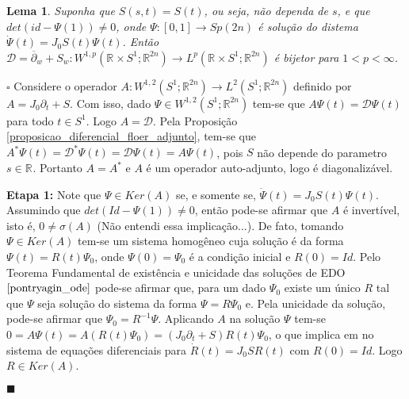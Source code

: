 \documentclass[12pt]{book}
\newtheorem{lema}[teorema]{Lema}
\newenvironment{prova}[1]{$\square$ #1}{\hfill$\blacksquare$}
\newcommand{\circulo}{S^{1}}
\newcommand{\diferencialfloerabrev}{\mathcal{D}}
\newcommand{\derivadaparcialabrev}[1]{\partial_{#1}}
\newcommand{\espacoLdois}[1]{L^{2}(#1)}
\newcommand{\espacoLpcontradominio}[2]{L^{p}(#1;#2)}
\newcommand{\espacoLpretacirculo}{\espacoLpcontradominio{\retacartesianocirculo}{\real{2n}}}
\newcommand{\espacosobolevcontradominio}[2]{W^{1,p}(#1;#2)}
\newcommand{\espacosobolevretacirculo}{\espacosobolevcontradominio{\retacartesianocirculo}{\real{2n}}}
\newcommand{\espacosobolevgeral}[2]{W^{1,#1}(#2)}
\newcommand{\espectrooperador}[1]{\sigma(#1)}
\newcommand{\estruturacomplexa}{J_{0}}
\newcommand{\gruposimpletico}[1]{Sp(#1)}
\newcommand{\operadorcauchyabrev}[1]{\overline{\partial}_{#1}}
\newcommand{\retacartesianocirculo}{\real{} \times \circulo}
\newcommand{\real}[1]{\mathbb{R}^{#1}}
\newcommand{\vermelho}[1]{{\color{red}#1}}
\begin{document}
	\begin{lema}\label{lema_diferencial_floer_bijecao}
		Suponha que $S(s,t) = S(t)$, ou seja, não dependa de $s$, e que $det(id - \Psi(1)) \neq 0 $, onde $\Psi:[0,1] \to \gruposimpletico{2n}$ é solução do distema $\dot{\Psi}(t)=\estruturacomplexa S(t)\Psi(t)$. Então $\diferencialfloerabrev = \operadorcauchyabrev{w} + S_{w}: \espacosobolevretacirculo \to \espacoLpretacirculo$ é bijetor para $1 < p <\infty$.
	\end{lema}
	\begin{prova}
		Considere o operador $A: \espacosobolevgeral{2}{\circulo;\real{2n}} \to \espacoLdois{\circulo;\real{2n}}$ definido por $A = \estruturacomplexa \derivadaparcialabrev{t} + S$. Com isso, dado $\Psi \in \espacosobolevgeral{2}{\circulo;\real{2n}}$ tem-se que $A\Psi(t) = \diferencialfloerabrev\Psi(t)$ para todo $t \in \circulo$. Logo $A=\diferencialfloerabrev$. Pela Proposição \ref{proposicao_diferencial_floer_adjunto}, tem-se que $A^{*}\Psi(t) = \diferencialfloerabrev^{*}\Psi(t) = \diferencialfloerabrev\Psi(t) = A\Psi(t)$, pois $S$ não depende do parametro $s \in \real{}$. Portanto $A=A^{*}$ e $A$ é um operador auto-adjunto, logo é diagonalizável.
		
		\textbf{Etapa 1:} Note que $\Psi \in Ker(A)$ se, e somente se, $\dot{\Psi}(t)=\estruturacomplexa S(t)\Psi(t)$. Assumindo que $det(Id - \Psi(1)) \neq 0$, então pode-se afirmar que $A$ é invertível, isto é, $0\neq \espectrooperador{A}$ \vermelho{(Não entendi essa implicação...)}. De fato, tomando $\Psi \in Ker(A)$ tem-se um sistema homogêneo cuja solução é da forma $\Psi(t) = R(t)\Psi_{0}$, onde $\Psi(0)=\Psi_{0}$ é a condição inicial e $R(0) = Id$. Pelo Teorema Fundamental de existência e unicidade das soluções de EDO $\cite{pontryagin_ode}$ pode-se afirmar que, para um dado $\Psi_{0}$ existe um único $R$ tal que $\Psi$ seja solução do sistema da forma $\Psi = R\Psi_{0}$ e. Pela unicidade da solução, pode-se afirmar que $\Psi_{0}=R^{-1}\Psi$. Aplicando $A$ na solução $\Psi$ tem-se
		$0=A\Psi(t) = A(R(t)\Psi_{0}) = (\estruturacomplexa\derivadaparcialabrev{t}+S)R(t)\Psi_{0}$, o que implica em no sistema de equações diferenciais para $\dot{R}(t) = \estruturacomplexa SR(t)$ com $R(0) = Id$. Logo $R \in Ker(A)$.
		

\end{prova}
\end{document}
